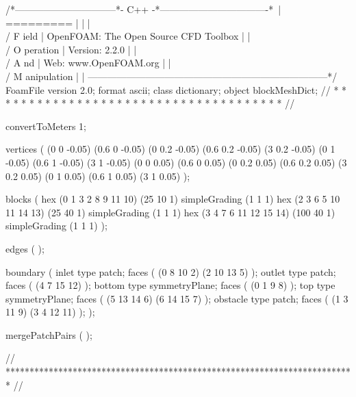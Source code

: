 \begin{OFverbatim}
/*--------------------------------*- C++ -*----------------------------------*\
| =========                 |                                                 |
| \\      /  F ield         | OpenFOAM: The Open Source CFD Toolbox           |
|  \\    /   O peration     | Version:  2.2.0                                 |
|   \\  /    A nd           | Web:      www.OpenFOAM.org                      |
|    \\/     M anipulation  |                                                 |
\*---------------------------------------------------------------------------*/
FoamFile
{
    version     2.0;
    format      ascii;
    class       dictionary;
    object      blockMeshDict;
}
// * * * * * * * * * * * * * * * * * * * * * * * * * * * * * * * * * * * * * //

convertToMeters 1;

vertices        
(
    (0 0 -0.05)
    (0.6 0 -0.05)
    (0 0.2 -0.05)
    (0.6 0.2 -0.05)
    (3 0.2 -0.05)
    (0 1 -0.05)
    (0.6 1 -0.05)
    (3 1 -0.05)
    (0 0 0.05)
    (0.6 0 0.05)
    (0 0.2 0.05)
    (0.6 0.2 0.05)
    (3 0.2 0.05)
    (0 1 0.05)
    (0.6 1 0.05)
    (3 1 0.05)
);

blocks          
(
    hex (0 1 3 2 8 9 11 10) (25 10 1) simpleGrading (1 1 1)
    hex (2 3 6 5 10 11 14 13) (25 40 1) simpleGrading (1 1 1)
    hex (3 4 7 6 11 12 15 14) (100 40 1) simpleGrading (1 1 1)
);

edges           
(
);

boundary
(
    inlet
    {
        type patch;
        faces
        (
            (0 8 10 2)
            (2 10 13 5)
        );
    }
    outlet
    {
        type patch;
        faces
        (
            (4 7 15 12)
        );
    }
    bottom
    {
        type symmetryPlane;
        faces
        (
            (0 1 9 8)
        );
    }
    top
    {
        type symmetryPlane;
        faces
        (
            (5 13 14 6)
            (6 14 15 7)
        );
    }
    obstacle
    {
        type patch;
        faces
        (
            (1 3 11 9)
            (3 4 12 11)
        );
    }
);

mergePatchPairs
(
);

// ************************************************************************* //
\end{OFverbatim}


